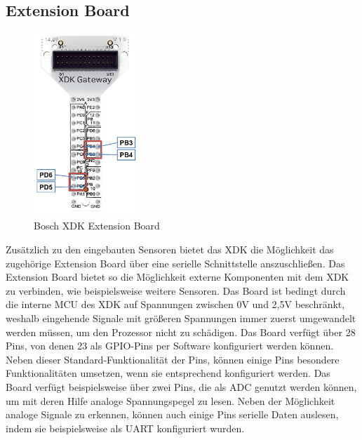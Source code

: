 \subsection{Extension Board}\label{subsec:Extension Board}
\begin{figure}[H]
	\centering
	\includegraphics[width=4cm]{images/ExtensionBoard.png}	
	\caption{Bosch \acs*{XDK} Extension Board}
	\label{fig:Extension_Board}
\end{figure}
Zusätzlich zu den eingebauten Sensoren bietet das \acs*{XDK} die Möglichkeit das zugehörige Extension Board über eine serielle Schnittstelle anszuschließen. Das Extension Board bietet so die Möglichkeit externe Komponenten mit dem \acs{XDK} zu verbinden, wie beispielsweise weitere Sensoren. Das Board ist bedingt durch die interne \acf{MCU} des \acs{XDK} auf Spannungen zwischen 0V und 2,5V beschränkt, weshalb eingehende Signale mit größeren Spannungen immer zuerst umgewandelt werden müssen, um den Prozessor nicht zu schädigen. Das Board verfügt über 28 Pins, von denen 23 als \acf{GPIO}-Pins per Software konfiguriert werden können. Neben dieser Standard-Funktionalität der Pins, können einige Pins besondere Funktionalitäten umsetzen, wenn sie entsprechend konfiguriert werden. Das Board verfügt beispielsweise über zwei Pins, die als \acf{ADC} genutzt werden können, um mit deren Hilfe analoge Spannungspegel zu lesen. Neben der Möglichkeit analoge Signale zu erkennen, können auch einige Pins serielle Daten auslesen, indem sie beispielsweise als \acf{UART} konfiguriert wurden.


